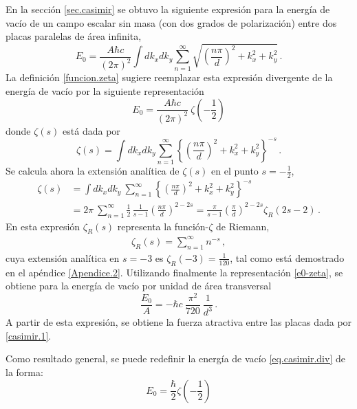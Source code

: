 En la sección \ref{sec.casimir} se obtuvo la siguiente expresión para la energía de vacío de un campo escalar sin masa (con dos grados de polarización) entre dos placas paralelas de área infinita,
\begin{equation}
E _0 = \frac{A \hbar c}{(2 \pi) ^2} \int dk _x dk _y 
\sum _{n=1} ^{\infty} 
\sqrt{
		\left( \frac{n \pi}{d} \right) ^2 + k _x ^2 + k _y ^2
		} \, .
\end{equation}
La definición \eqref{funcion.zeta} sugiere reemplazar esta expresión divergente de la energía de vacío por la siguiente representación
\begin{equation}\label{e0-zeta}
E _0 = \frac{A \hbar c}{(2 \pi) ^2} 
\ \zeta \left( - \frac{1}{2} \right)
\end{equation}
donde $\zeta (s)$ está dada por
\begin{equation}
\zeta(s) = \int dk _x dk _y 
\sum _{n=1} ^{\infty} 
\left\{\left( \frac{n \pi}{d} \right) ^2 + k _x ^2 + k _y ^2\right\}^{-s}\,.
\end{equation}
Se calcula ahora la extensión analítica de $\zeta(s)$ en el punto $s=-\frac12$,
\begin{align}
\zeta (s) &= 
\int dk _x dk _y 
\ \sum _{n=1} ^{\infty} 
\left\{	\left( \frac{n \pi}{d} \right) ^2 + k _x ^2 + k _y ^2
		\right\}^{-s} \nonumber\\[2mm]
&=2\pi\ \sum _{n=1} ^{\infty}  \frac12\,\frac{1}{s-1} \left( \frac{n \pi}{d} \right) ^{2-2s} =
\frac{\pi}{s-1} \left( \frac{\pi}{d} \right) ^{2-2s} \zeta_R (2s-2)\,.
\end{align}
En esta expresión $\zeta_R(s)$ representa la función-$\zeta$ de Riemann,
\begin{align}\label{rieman-zeta-def}
	\zeta_R(s)=\sum_{n=1}^\infty n^{-s}\,,
\end{align}
cuya extensión analítica en $s=-3$ es $\zeta_R(-3)=\frac{1}{120}$, tal como está demostrado en el apéndice \ref{Apendice.2}. Utilizando finalmente la representación \eqref{e0-zeta}, se obtiene para la energía de vacío por unidad de área transversal
\begin{equation}
\frac{E _0}{A} = 
- \hbar c\ \frac{ \pi ^2}{720}\ \frac{1}{d^3}\,.
\end{equation}
A partir de esta expresión, se obtiene la fuerza atractiva entre las placas dada por \eqref{casimir.1}.

\bigskip

Como resultado general, se puede redefinir la energía de vacío \ref{eq.casimir.div} de la forma:
\begin{equation}
E _0 = \frac{\hbar}{2} \zeta  \left (- \frac{1}{2} \right) 
\label{eq.casimir.no.mu}
\end{equation}


